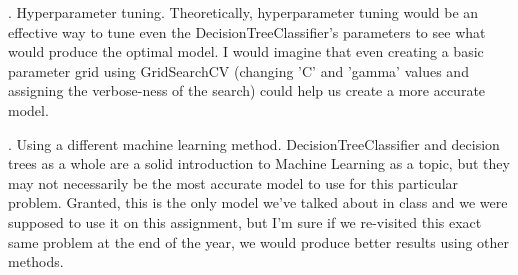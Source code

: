\documentclass[notitlepage]{report}
\begin{document}
. Hyperparameter tuning. Theoretically, hyperparameter tuning would be an effective way to tune even the DecisionTreeClassifier's parameters to see what would produce the optimal model. I would imagine that even creating a basic parameter grid using GridSearchCV (changing 'C' and 'gamma' values and assigning the verbose-ness of the search) could help us create a more accurate model.

. Using a different machine learning method. DecisionTreeClassifier and decision trees as a whole are a solid introduction to Machine Learning as a topic, but they may not necessarily be the most accurate model to use for this particular problem. Granted, this is the only model we've talked about in class and we were supposed to use it on this assignment, but I'm sure if we re-visited this exact same problem at the end of the year, we would produce better results using other methods.
\end{document}

